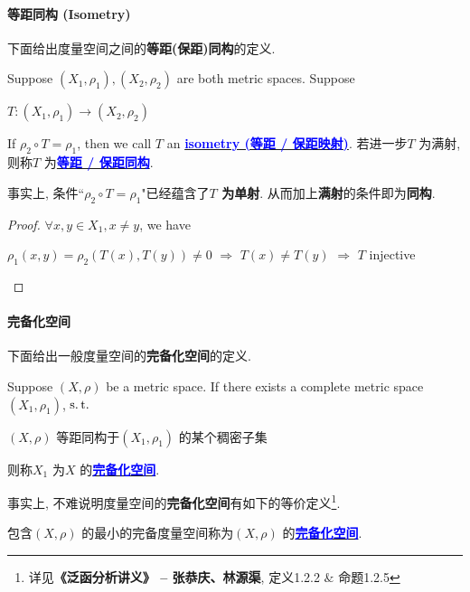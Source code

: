 \vspace{2em}

\paragraph{等距同构 (Isometry)}
	下面给出度量空间之间的\textbf{等距(保距)同构}的定义.
	\begin{defn}\label{def 1.2.6}
		Suppose $(X_1 , \rho_1) , (X_2 , \rho_2)$ are both metric spaces. Suppose
		\begin{center}
			$T : (X_1 , \rho_1) \rightarrow (X_2 , \rho_2)$
		\end{center}
		If $\rho_2 \circ T = \rho_1$, then we call $T$ an \underline{\textcolor{blue}{\textbf{isometry (等距 / 保距映射)}}}. 若进一步$T$ 为满射, 则称$T$ 为\underline{\textcolor{blue}{\textbf{等距 / 保距同构}}}.
		
		\vspace{2em}
		\begin{rmk}
			事实上, 条件``\underline{$\rho_2 \circ T = \rho_1$}"已经蕴含了\textbf{$T$ 为单射}. 从而加上\textbf{满射}的条件即为\textbf{同构}.
			
			\vspace{1em}
			
			\begin{proof}
				$\forall x , y \in X_1 , x \neq y$, we have
				\begin{center}
					$\rho_1(x , y) = \rho_2(T(x) , T(y)) \neq 0 \,\, \Rightarrow \,\, T(x) \neq T(y) \,\, \Rightarrow \,\, T$ injective
				\end{center}
			\end{proof}
		\end{rmk}
	\end{defn}

\vspace{4em}

\paragraph{完备化空间}
	下面给出一般度量空间的\textbf{完备化空间}的定义.
	\begin{defn}\label{def 1.2.7}
		Suppose $(X , \rho)$ be a metric space. If there exists a complete metric space $(X_1 , \rho_1)$, $\operatorname{s.t.}$
		\begin{center}
			$(X , \rho)$ 等距同构于$(X_1 , \rho_1)$ 的某个稠密子集
		\end{center}
		则称$X_1$ 为$X$ 的\underline{\textcolor{blue}{\textbf{完备化空间}}}.
		
		\vspace{2em}
		
		\begin{rmk}
			事实上, 不难说明度量空间的\textbf{完备化空间}有如下的等价定义\footnote{详见\textbf{《泛函分析讲义》 -- 张恭庆、林源渠}, 定义1.2.2 $\&$ 命题1.2.5}.
			\begin{defn}
				包含$(X , \rho)$ 的最小的完备度量空间称为$(X , \rho)$ 的\underline{\textcolor{blue}{\textbf{完备化空间}}}.
			\end{defn}
		\end{rmk}
	\end{defn}

